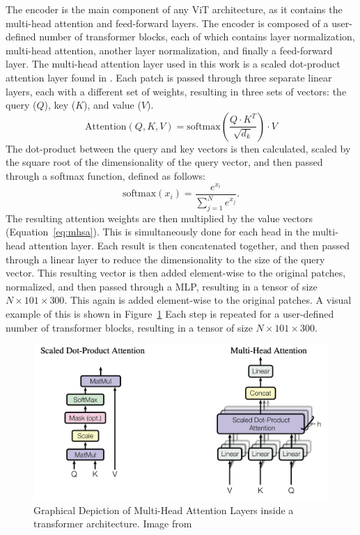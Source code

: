 The encoder is the main component of any ViT architecture, as it contains the 
multi-head attention and feed-forward layers. The encoder is composed of a user-defined number of
transformer blocks, each of which contains layer normalization, multi-head attention, another 
layer normalization, and finally a feed-forward layer. The multi-head attention layer 
used in this work is a scaled dot-product attention layer found in \textcite{vaswani2017}. Each patch 
is passed through three separate linear layers, each with a different set of weights, 
resulting in three sets of vectors: the query ($Q$), key ($K$), and value ($V$).
\begin{equation}
    \label{eq:mhsa}
    \text{Attention}(Q, K, V) = \text{softmax}\left(\frac{Q\cdot K^T}{\sqrt{d_k}}\right)\cdot V
\end{equation}
The dot-product between the query and key vectors is then calculated,
scaled by the square root of the dimensionality of the query vector, and then passed through a softmax function, 
defined as follows:
\begin{equation}
    \text{softmax}(x_i) = \frac{e^{x_i}}{\sum_{j=1}^N e^{x_j}}.
\end{equation}
The resulting attention weights are then multiplied by the value vectors (Equation~\ref{eq:mhsa}). 
This is simultaneously done for each head in the multi-head attention layer. Each result is then 
concatenated together, and then passed through a linear layer to reduce the dimensionality
to the size of the query vector. This resulting vector is then added
element-wise to the original patches, normalized, and then passed through a MLP, 
resulting in a tensor of size $N \times 101 \times 300$. This again is added element-wise to the original patches. A 
visual example of this is shown in Figure~\ref{fig:attention}
Each step is repeated for a user-defined number of transformer blocks, resulting in a tensor of size
$N \times 101 \times 300$.

\begin{figure}[hb!]
    \centering
    \includegraphics[width=.8\textwidth]{figures/transformer_paper/SelfAttention_MHSA.png}
    \caption[Transformer Attention]{Graphical Depiction of Multi-Head Attention Layers inside a 
    transformer architecture. Image from \textcite{vaswani2017}}
    \label{fig:attention}
\end{figure}

